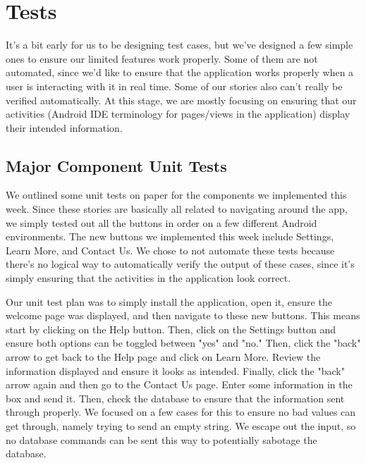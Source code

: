 \documentclass[a4paper]{article}
\begin{document}
\pagebreak
\section{Tests}
It's a bit early for us to be designing test cases, but we've designed a few simple ones to ensure our limited features work properly. Some of them are not automated, since we'd like to ensure that the application works properly when a user is interacting with it in real time. Some of our stories also can't really be verified automatically. At this stage, we are mostly focusing on ensuring that our activities (Android IDE terminology for pages/views in the application) display their intended information. 
\subsection{Major Component Unit Tests}
We outlined some unit tests on paper for the components we implemented this week. Since these stories are basically all related to navigating around the app, we simply tested out all the buttons in order on a few different Android environments. The new buttons we implemented this week include Settings, Learn More, and Contact Us. We chose to not automate these tests because there's no logical way to automatically verify the output of these cases, since it's simply ensuring that the activities in the application look correct.

Our unit test plan was to simply install the application, open it, ensure the welcome page was displayed, and then navigate to these new buttons. This means start by clicking on the Help button. Then, click on the Settings button and ensure both options can be toggled between "yes" and "no." Then, click the "back" arrow to get back to the Help page and click on Learn More. Review the information displayed and ensure it looks as intended. Finally, click the "back" arrow again and then go to the Contact Us page. Enter some information in the box and send it. Then, check the database to ensure that the information sent through properly. We focused on a few cases for this to ensure no bad values can get through, namely trying to send an empty string. We escape out the input, so no database commands can be sent this way to potentially sabotage the database.
\end{document}
